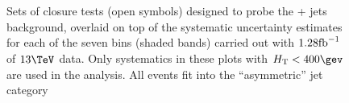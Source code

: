 \begin{figure}[h!]
  \begin{center}
     ~~
     \\
     ~~
     \\
    \caption{Sets of closure tests (open symbols) designed to probe
      the \znunu + jets background, overlaid on top of
      the systematic uncertainty estimates for each of the seven
      \scalht bins (shaded bands) carried out with $1.28\text{fb}^{-1}$ of
      $13\tev$ data. Only systematics in these plots with
      $\scalht<400\gev$ are used in the analysis. All events fit 
      into the ``asymmetric'' jet
      category}
    \label{fig:ZinvclosureDataAsymlt400}
  \end{center} 
\end{figure}

